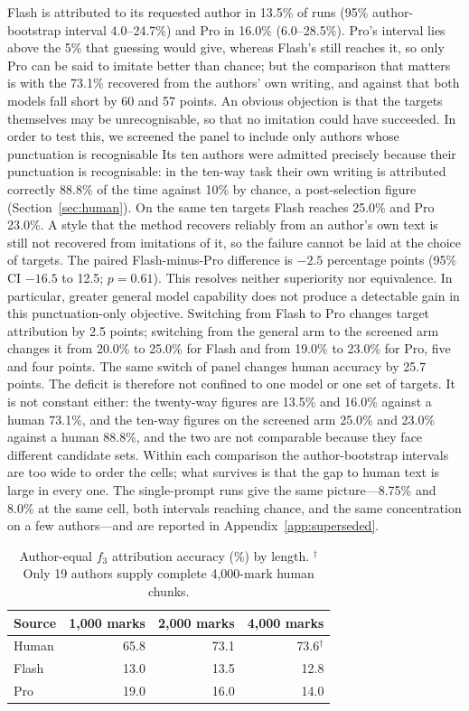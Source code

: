 \documentclass[11pt]{article}
\newcommand{\fThree}{\ensuremath{f_3}\xspace}
\begin{document}
Flash is attributed to its requested author in 13.5\% of runs (95\%
author-bootstrap interval 4.0--24.7\%) and Pro in 16.0\% (6.0--28.5\%).
Pro's interval lies above the 5\% that guessing would give, whereas
Flash's still reaches it, so only Pro can be said to imitate better than
chance; but the comparison that matters is with the 73.1\% recovered
from the authors' own writing, and against that both models fall short
by 60 and 57 points. An obvious objection is that the targets themselves may be
unrecognisable, so that no imitation could have succeeded.  In order to test this, 
we screened the panel to include only authors whose punctuation is recognisable
Its ten authors were admitted precisely
because their punctuation is recognisable: in the ten-way task their own
writing is attributed correctly 88.8\% of the time against 10\% by
chance, a post-selection figure (Section~\ref{sec:human}).
 On the same ten targets Flash reaches 25.0\% and
Pro 23.0\%.  A style that the method recovers reliably from an author's
own text is still not recovered from imitations of it, so the failure
cannot be laid at the choice of targets. The paired Flash-minus-Pro difference is \(-2.5\) percentage points (95\% CI
\(-16.5\) to 12.5; \(p=0.61\)).  This resolves neither superiority nor
equivalence.  In particular, greater general model capability does not produce
a detectable gain in this punctuation-only objective.
Switching from Flash to Pro changes target
attribution by 2.5 points; switching from the general arm to the
screened arm changes it from 20.0\% to 25.0\% for Flash and from 19.0\%
to 23.0\% for Pro, five and four points.  The same switch of panel changes
human accuracy by 25.7 points.  The deficit is therefore not confined to
one model or one set of targets.  It is not constant either: the
twenty-way figures are 13.5\% and 16.0\% against a human 73.1\%, and the
ten-way figures on the screened arm 25.0\% and 23.0\% against a human
88.8\%, and the two are not comparable because they face different
candidate sets.  Within each comparison the author-bootstrap intervals
are too wide to order the cells; what survives is that the gap to human
text is large in every one.
The single-prompt runs give the same picture---8.75\% and 8.0\% at the
same cell, both intervals reaching chance, and the same concentration on
a few authors---and are reported in Appendix~\ref{app:superseded}.

\begin{table}[htbp]
  \centering
  \begin{tabular}{lrrr}
    \toprule
    Source & 1,000 marks & 2,000 marks & 4,000 marks \\
    \midrule
    Human & 65.8 & 73.1 & 73.6\(^\dagger\) \\
    Flash & 13.0 & 13.5 & 12.8 \\
    Pro & 19.0 & 16.0 & 14.0 \\
    \bottomrule
  \end{tabular}
  \caption{Author-equal \fThree attribution accuracy (\%) by length.
  \(^\dagger\)Only 19 authors supply complete 4,000-mark human chunks.}
  \label{tab:length-attribution}
\end{table}
\end{document}
